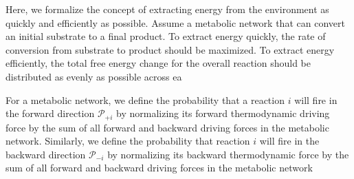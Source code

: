 Here, we formalize the concept of extracting energy from the environment as quickly and efficiently as possible. Assume a metabolic network that can convert an initial substrate to a final product. To extract energy quickly, the rate of conversion from substrate to product should be maximized.  To extract energy efficiently, the total free energy change for the overall reaction should be distributed as evenly as possible across ea


For a metabolic network, we define the probability that a reaction $i$ will fire in the forward  direction ${\mathcal P_{+i}}$ by normalizing its forward thermodynamic driving force by the sum of all forward and backward driving forces in the metabolic network. Similarly, we define the probability that reaction $i$ will fire in the backward direction $\mathcal P_{-i}$ by normalizing its backward thermodynamic force by  the sum of all forward and backward driving forces in the metabolic network